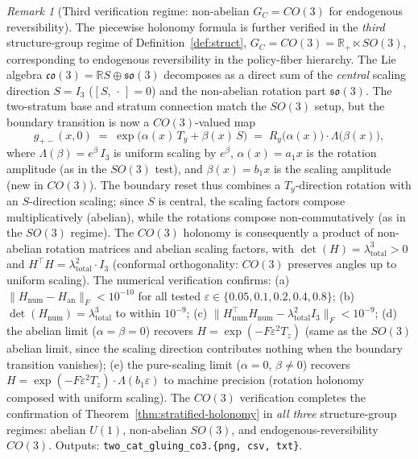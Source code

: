 \documentclass[11pt,a4paper]{article}
\theoremstyle{plain}
\theoremstyle{definition}
\theoremstyle{remark}
\newtheorem{remark}[theorem]{Remark}
\begin{document}
\begin{remark}[Third verification regime: non-abelian $G_C = CO(3)$ for
endogenous reversibility]
\label{rem:2cat-gluing-co3}
The piecewise holonomy formula is further verified in the \emph{third}
structure-group regime of Definition~\ref{def:struct}, $G_C = CO(3)
= \mathbb{R}_+ \ltimes SO(3)$, corresponding to endogenous reversibility
in the policy-fiber hierarchy. The Lie algebra $\mathfrak{co}(3) =
\mathbb{R} S \oplus \mathfrak{so}(3)$ decomposes as a direct sum of the
\emph{central} scaling direction $S = I_3$ ($[S, \,\cdot\,] = 0$) and the
non-abelian rotation part $\mathfrak{so}(3)$. The two-stratum base and
stratum connection match the $SO(3)$ setup, but the boundary transition
is now a $CO(3)$-valued map
\begin{equation}\label{eq:co3-transition}
  g_{+-}(x, 0) \;=\; \exp\bigl(\alpha(x)\,T_y + \beta(x)\,S\bigr)
  \;=\; R_y\bigl(\alpha(x)\bigr) \cdot \Lambda\bigl(\beta(x)\bigr),
\end{equation}
where $\Lambda(\beta) = e^{\beta}\,I_3$ is uniform scaling by $e^{\beta}$,
$\alpha(x) = a_1 x$ is the rotation amplitude (as in the $SO(3)$ test),
and $\beta(x) = b_1 x$ is the scaling amplitude (new in $CO(3)$). The
boundary reset thus combines a $T_y$-direction rotation with an $S$-direction
scaling; since $S$ is central, the scaling factors compose multiplicatively
(abelian), while the rotations compose non-commutatively (as in the $SO(3)$
regime). The $CO(3)$ holonomy is consequently a product of non-abelian
rotation matrices and abelian scaling factors, with $\det(H) =
\lambda_{\mathrm{total}}^3 > 0$ and $H^\top H = \lambda_{\mathrm{total}}^2
\cdot I_3$ (conformal orthogonality: $CO(3)$ preserves angles up to uniform
scaling). The numerical verification confirms: (a)
$\|H_{\mathrm{num}} - H_{\mathrm{an}}\|_F < 10^{-10}$ for all tested
$\varepsilon \in \{0.05, 0.1, 0.2, 0.4, 0.8\}$; (b)
$\det(H_{\mathrm{num}}) = \lambda_{\mathrm{total}}^3$ to within $10^{-9}$;
(c) $\|H_{\mathrm{num}}^\top H_{\mathrm{num}} -
\lambda_{\mathrm{total}}^2 I_3\|_F < 10^{-9}$; (d) the abelian limit
($\alpha = \beta = 0$) recovers $H = \exp(-F\varepsilon^2 T_z)$ (same
as the $SO(3)$ abelian limit, since the scaling direction contributes
nothing when the boundary transition vanishes); (e) the pure-scaling
limit ($\alpha = 0$, $\beta \neq 0$) recovers $H =
\exp(-F\varepsilon^2 T_z) \cdot \Lambda(b_1 \varepsilon)$ to machine
precision (rotation holonomy composed with uniform scaling). The $CO(3)$
verification completes the confirmation of
Theorem~\ref{thm:stratified-holonomy} in
\emph{all three} structure-group regimes: abelian $U(1)$, non-abelian $SO(3)$,
and endogenous-reversibility $CO(3)$. Outputs:
\texttt{two\_cat\_gluing\_co3.\{png, csv, txt\}}.
\end{remark}
\end{document}
